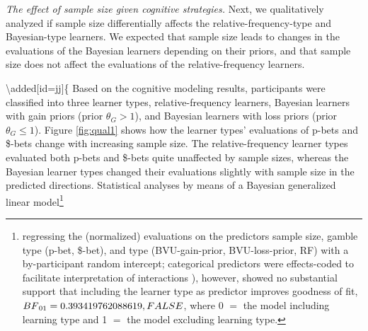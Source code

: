 \documentclass[a4paper, man, floatsintext]{apa6}
\let\rmarkdownfootnote\footnote%
\def\footnote{\protect\rmarkdownfootnote}
\begin{document}
\emph{The effect of sample size given cognitive strategies.} Next, we
qualitatively analyzed if sample size differentially affects the
relative-frequency-type and Bayesian-type learners. We expected that
sample size leads to changes in the evaluations of the Bayesian learners
depending on their priors, and that sample size does not affect the
evaluations of the relative-frequency learners. 

\textbackslash{}added{[}id=jj{]}\{ Based on the cognitive modeling
results, participants were classified into three learner types,
relative-frequency learners, Bayesian learners with gain priors (prior
\(\theta_G > 1\)), and Bayesian learners with loss priors (prior
\(\theta_G \leq 1\)). Figure \ref{fig:qual1} shows how the learner
types' evaluations of p-bets and \$-bets change with increasing sample
size. The relative-frequency learner types evaluated both p-bets and
\$-bets quite unaffected by sample sizes, whereas the Bayesian learner
types changed their evaluations slightly with sample size in the
predicted directions. Statistical analyses by means of a Bayesian
generalized linear
model\footnote{regressing the (normalized) evaluations on the predictors sample size, gamble type (p-bet, \$-bet), and type (BVU-gain-prior, BVU-loss-prior, RF) with a by-participant random intercept; categorical predictors were effects-coded to facilitate interpretation of interactions \citep[for details, see][]{SingmannForthcoming}), however, showed no substantial support that including the learner type as predictor improves goodness of fit, $BF\textsubscript{01}=0.393419762088619, FALSE$, where 0 $=$ the model including learning type and 1 $=$ the model excluding learning type.
}
\end{document}
